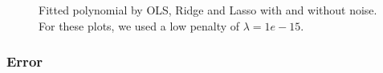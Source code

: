 \begin{figure} [H]
    \caption{Fitted polynomial by OLS, Ridge and Lasso with and without noise. For these plots, we used a low penalty of $\lambda=1e-15$.}%
    \label{fig:example}%
\end{figure}

\subsubsection{Error}

